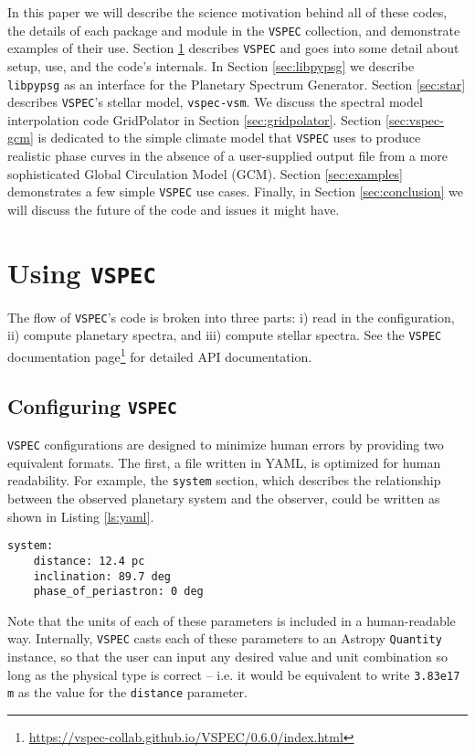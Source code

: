 \documentclass[linenumbers,preprint,authoryear]{elsarticle}
\newcommand{\vspec}[1]{\texttt{VSPEC}#1}
\begin{document}
In this paper we will describe the science motivation behind all of these codes, the details of each package and module in the \vspec{} collection, and demonstrate examples of their use. Section \ref{sec:vspec} describes \vspec{} and goes into some detail about setup, use, and the code's internals. In Section \ref{sec:libpypsg} we describe \texttt{libpypsg} as an interface for the Planetary Spectrum Generator. Section \ref{sec:star} describes \vspec{}'s stellar model, \texttt{vspec-vsm}. We discuss the spectral model interpolation code GridPolator in Section \ref{sec:gridpolator}. Section \ref{sec:vspec-gcm} is dedicated to the simple climate model that \vspec{} uses to produce realistic phase curves in the absence of a user-supplied output file from a more sophisticated Global Circulation Model (GCM). Section \ref{sec:examples} demonstrates a few simple \vspec{} use cases. Finally, in Section \ref{sec:conclusion} we will discuss the future of the code and issues it might have.

\section{Using \vspec{}}
\label{sec:vspec}

The flow of \vspec{}'s code is broken into three parts: i) read in the configuration, ii) compute planetary spectra, and iii) compute stellar spectra.
See the \vspec{} documentation page\footnote{\href{https://vspec-collab.github.io/VSPEC/0.6.0/index.html}{https://vspec-collab.github.io/VSPEC/0.6.0/index.html}} for detailed API documentation.
\subsection{Configuring \vspec{}}
\label{subsec:config}

\vspec{} configurations are designed to minimize human errors by providing two equivalent formats. The first, a file written in YAML, is optimized for
human readability. For example, the \texttt{system} section, which describes the relationship between the observed planetary system and the observer, could
be written as shown in Listing \ref{ls:yaml}.
\begin{lstlisting}[label={ls:yaml},caption=\vspec{} YAML Configuration]
system:
    distance: 12.4 pc
    inclination: 89.7 deg
    phase_of_periastron: 0 deg
\end{lstlisting}
Note that the units of each of these parameters is included in a human-readable way. Internally, \vspec{} casts each of these parameters to an Astropy
\texttt{Quantity} instance, so that the user can input any desired value and unit combination so long as the physical type is correct -- i.e. it would be
equivalent to write \texttt{3.83e17 m} as the value for the \texttt{distance} parameter.
\end{document}
